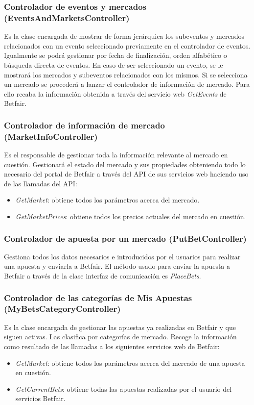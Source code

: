 \subsubsection{Controlador de eventos y mercados (EventsAndMarketsController)}

 Es la clase encargada de mostrar de forma jerárquica los subeventos y mercados relacionados con un evento seleccionado previamente en el controlador de eventos. Igualmente se podrá gestionar por fecha de finalización, orden alfabético o búsqueda directa de eventos. En caso de ser seleccionado un evento, se le mostrará los mercados y subeventos relacionados con los mismos. Si se selecciona un mercado se procederá a lanzar el controlador de información de mercado. Para ello recaba la información obtenida a través del servicio web \emph{GetEvents} de Betfair.
 
\subsubsection{Controlador de información de mercado (MarketInfoController)}

 Es el responsable de gestionar toda la información relevante al mercado en cuestión. Gestionará el estado del mercado y sus propiedades obteniendo todo lo necesario del portal de Betfair a través del API de sus servicios web haciendo uso de las llamadas del API:
 
  \begin{itemize}
	\item \emph{GetMarket}: obtiene todos los parámetros acerca del mercado.
	\item \emph{GetMarketPrices}: obtiene todos los precios actuales del mercado en cuestión.
\end{itemize}

\subsubsection{Controlador de apuesta por un mercado (PutBetController)}
 Gestiona todos los datos necesarios e introducidos por el usuarios para realizar una apuesta y enviarla a Betfair. El método usado para enviar la apuesta a Betfair a través de la clase interfaz de comunicación es \emph{PlaceBets}.

\subsubsection{Controlador de las categorías de Mis Apuestas (MyBetsCategoryController)}
 Es la clase encargada de gestionar las apuestas ya realizadas en Betfair y que siguen activas. Las clasifica por categorías de mercado. Recoge la información como resultado de las llamadas a los siguientes servicios web de Betfair:
  \begin{itemize}
	\item \emph{GetMarket}: obtiene todos los parámetros acerca del mercado de una apuesta en cuestión.
	\item \emph{GetCurrentBets}: obtiene todas las apuestas realizadas por el usuario del servicios Betfair.
\end{itemize}
 
